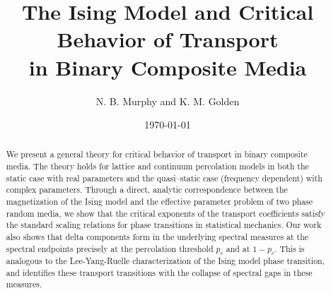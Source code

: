 \documentclass[english,12pt,jmp,graphicx]{revtex4-1}
\begin{document}

\title{The Ising Model
and Critical Behavior of Transport \\in Binary Composite Media} %



\author{N. B. Murphy and K. M. Golden}
%


\date{\today}

\begin{abstract}
%
We present a general theory for critical behavior of transport in
binary composite media. The theory holds for lattice and continuum
percolation models in both the static case with real parameters and
the quasi--static case (frequency dependent) with complex
parameters. Through a direct, analytic correspondence between the
magnetization of the Ising model and the effective parameter problem
of two phase random media, we show that the critical exponents of the
transport coefficients satisfy the standard scaling relations for
phase transitions in statistical mechanics. Our work also shows that
delta components form in the underlying spectral measures at the
spectral endpoints precisely at the percolation threshold $p_c$ and at
$1-p_c$. This is analogous to the Lee-Yang-Ruelle characterization of
the Ising model phase transition, and identifies these transport
transitions with the collapse of spectral gaps in these measures. 
%
\end{abstract}
\end{document}
